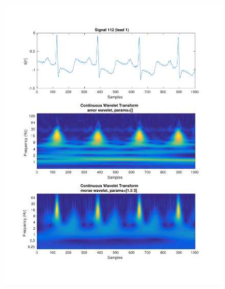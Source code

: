 \documentclass{beamer}
\begin{document}
\begin{frame}
\begin{columns}
\begin{figure}
\includegraphics[width=\textwidth]{fig/112l1_cwt.pdf}
\end{figure}
\end{columns}
\end{frame}
\end{document}
